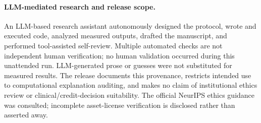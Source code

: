\documentclass{article}
\begin{document}
\paragraph{LLM-mediated research and release scope.}
An LLM-based research assistant autonomously designed the protocol, wrote and executed code, analyzed measured outputs, drafted the manuscript, and performed tool-assisted self-review. Multiple automated checks are not independent human verification; no human validation occurred during this unattended run. LLM-generated prose or guesses were not substituted for measured results. The release documents this provenance, restricts intended use to computational explanation auditing, and makes no claim of institutional ethics review or clinical/credit-decision suitability. The official NeurIPS ethics guidance was consulted; incomplete asset-license verification is disclosed rather than asserted away.

\clearpage

\end{document}

